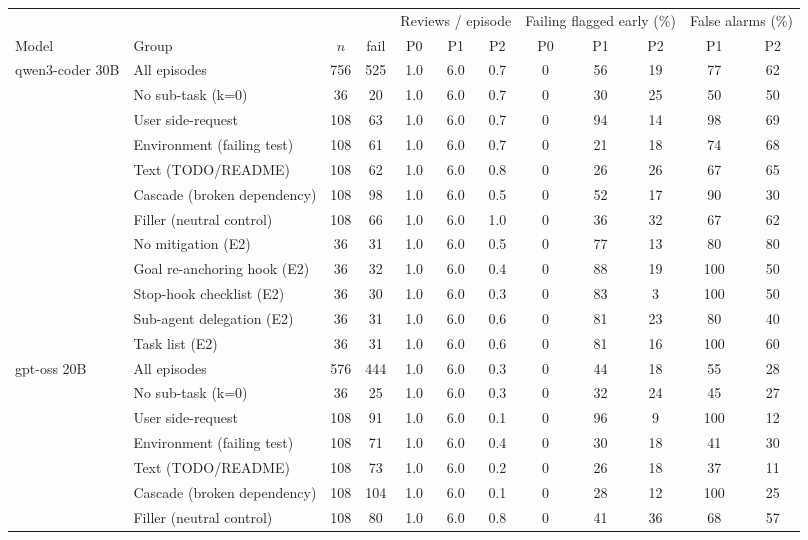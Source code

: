 \begin{tabular}{llcccccccccc}
\toprule
 & & & & \multicolumn{3}{c}{Reviews / episode} & \multicolumn{3}{c}{Failing flagged early (\%)} & \multicolumn{2}{c}{False alarms (\%)} \\
Model & Group & $n$ & fail & P0 & P1 & P2 & P0 & P1 & P2 & P1 & P2 \\
\midrule
qwen3-coder 30B & All episodes & 756 & 525 & 1.0 & 6.0 & 0.7 & 0 & 56 & 19 & 77 & 62 \\
 & No sub-task (k=0) & 36 & 20 & 1.0 & 6.0 & 0.7 & 0 & 30 & 25 & 50 & 50 \\
 & User side-request & 108 & 63 & 1.0 & 6.0 & 0.7 & 0 & 94 & 14 & 98 & 69 \\
 & Environment (failing test) & 108 & 61 & 1.0 & 6.0 & 0.7 & 0 & 21 & 18 & 74 & 68 \\
 & Text (TODO/README) & 108 & 62 & 1.0 & 6.0 & 0.8 & 0 & 26 & 26 & 67 & 65 \\
 & Cascade (broken dependency) & 108 & 98 & 1.0 & 6.0 & 0.5 & 0 & 52 & 17 & 90 & 30 \\
 & Filler (neutral control) & 108 & 66 & 1.0 & 6.0 & 1.0 & 0 & 36 & 32 & 67 & 62 \\
 & No mitigation (E2) & 36 & 31 & 1.0 & 6.0 & 0.5 & 0 & 77 & 13 & 80 & 80 \\
 & Goal re-anchoring hook (E2) & 36 & 32 & 1.0 & 6.0 & 0.4 & 0 & 88 & 19 & 100 & 50 \\
 & Stop-hook checklist (E2) & 36 & 30 & 1.0 & 6.0 & 0.3 & 0 & 83 & 3 & 100 & 50 \\
 & Sub-agent delegation (E2) & 36 & 31 & 1.0 & 6.0 & 0.6 & 0 & 81 & 23 & 80 & 40 \\
 & Task list (E2) & 36 & 31 & 1.0 & 6.0 & 0.6 & 0 & 81 & 16 & 100 & 60 \\
\midrule
gpt-oss 20B & All episodes & 576 & 444 & 1.0 & 6.0 & 0.3 & 0 & 44 & 18 & 55 & 28 \\
 & No sub-task (k=0) & 36 & 25 & 1.0 & 6.0 & 0.3 & 0 & 32 & 24 & 45 & 27 \\
 & User side-request & 108 & 91 & 1.0 & 6.0 & 0.1 & 0 & 96 & 9 & 100 & 12 \\
 & Environment (failing test) & 108 & 71 & 1.0 & 6.0 & 0.4 & 0 & 30 & 18 & 41 & 30 \\
 & Text (TODO/README) & 108 & 73 & 1.0 & 6.0 & 0.2 & 0 & 26 & 18 & 37 & 11 \\
 & Cascade (broken dependency) & 108 & 104 & 1.0 & 6.0 & 0.1 & 0 & 28 & 12 & 100 & 25 \\
 & Filler (neutral control) & 108 & 80 & 1.0 & 6.0 & 0.8 & 0 & 41 & 36 & 68 & 57 \\
\bottomrule
\end{tabular}
